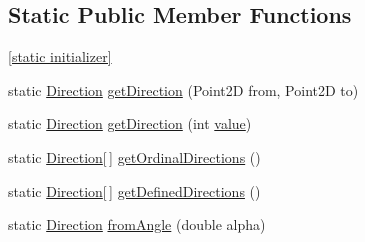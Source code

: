 \subsection*{Static Public Member Functions}
\begin{DoxyCompactItemize}
\item 
\hyperlink{enumorg_1_1tzi_1_1use_1_1gui_1_1views_1_1diagrams_1_1util_1_1_direction_a0941f143d7408709b210c4a1a1ac8060}{\mbox{[}static initializer\mbox{]}}
\item 
static \hyperlink{enumorg_1_1tzi_1_1use_1_1gui_1_1views_1_1diagrams_1_1util_1_1_direction}{Direction} \hyperlink{enumorg_1_1tzi_1_1use_1_1gui_1_1views_1_1diagrams_1_1util_1_1_direction_a7da80cd0f3a5c2c76130c08ae00f8b4c}{get\-Direction} (Point2\-D from, Point2\-D to)
\item 
static \hyperlink{enumorg_1_1tzi_1_1use_1_1gui_1_1views_1_1diagrams_1_1util_1_1_direction}{Direction} \hyperlink{enumorg_1_1tzi_1_1use_1_1gui_1_1views_1_1diagrams_1_1util_1_1_direction_abdf08c15bc7489bd00a758e3315ef66f}{get\-Direction} (int \hyperlink{enumorg_1_1tzi_1_1use_1_1gui_1_1views_1_1diagrams_1_1util_1_1_direction_a768d8dfd1377fb7ca62f8b910f7446f5}{value})
\item 
static \hyperlink{enumorg_1_1tzi_1_1use_1_1gui_1_1views_1_1diagrams_1_1util_1_1_direction}{Direction}\mbox{[}$\,$\mbox{]} \hyperlink{enumorg_1_1tzi_1_1use_1_1gui_1_1views_1_1diagrams_1_1util_1_1_direction_a9d110885eda87eabf8c7408193b8a76c}{get\-Ordinal\-Directions} ()
\item 
static \hyperlink{enumorg_1_1tzi_1_1use_1_1gui_1_1views_1_1diagrams_1_1util_1_1_direction}{Direction}\mbox{[}$\,$\mbox{]} \hyperlink{enumorg_1_1tzi_1_1use_1_1gui_1_1views_1_1diagrams_1_1util_1_1_direction_a2f876ce84c0fc85091c494f0b48bbcde}{get\-Defined\-Directions} ()
\item 
static \hyperlink{enumorg_1_1tzi_1_1use_1_1gui_1_1views_1_1diagrams_1_1util_1_1_direction}{Direction} \hyperlink{enumorg_1_1tzi_1_1use_1_1gui_1_1views_1_1diagrams_1_1util_1_1_direction_addac8c8c5a41be9e50c59f0e4f57928c}{from\-Angle} (double alpha)
\end{DoxyCompactItemize}
